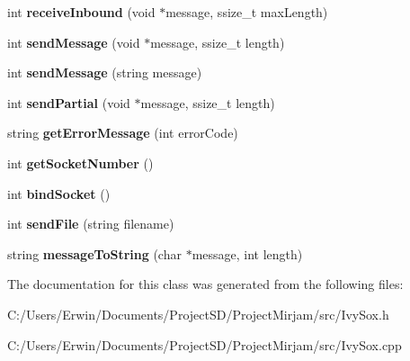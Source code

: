 \begin{DoxyCompactItemize}
\item 
\hypertarget{class_ivy_sox_a967f09bfa3ff35635d3f1e086193b140}{}int {\bfseries receive\+Inbound} (void $\ast$message, ssize\+\_\+t max\+Length)\label{class_ivy_sox_a967f09bfa3ff35635d3f1e086193b140}

\item 
\hypertarget{class_ivy_sox_a8cdc56a285fdd5b87873918c1c397e05}{}int {\bfseries send\+Message} (void $\ast$message, ssize\+\_\+t length)\label{class_ivy_sox_a8cdc56a285fdd5b87873918c1c397e05}

\item 
\hypertarget{class_ivy_sox_a49df5717e5cc8827d5725d832a0c4d17}{}int {\bfseries send\+Message} (string message)\label{class_ivy_sox_a49df5717e5cc8827d5725d832a0c4d17}

\item 
\hypertarget{class_ivy_sox_a3915fbfdfb0c5dd57da460f3de3fc21b}{}int {\bfseries send\+Partial} (void $\ast$message, ssize\+\_\+t length)\label{class_ivy_sox_a3915fbfdfb0c5dd57da460f3de3fc21b}

\item 
\hypertarget{class_ivy_sox_a58dac7efa4d8dbf6a08e98924ae9d584}{}string {\bfseries get\+Error\+Message} (int error\+Code)\label{class_ivy_sox_a58dac7efa4d8dbf6a08e98924ae9d584}

\item 
\hypertarget{class_ivy_sox_a09b0c17b4dda6c69e617e9271e9adb63}{}int {\bfseries get\+Socket\+Number} ()\label{class_ivy_sox_a09b0c17b4dda6c69e617e9271e9adb63}

\item 
\hypertarget{class_ivy_sox_afe73030aff140d6e1baa8324067d7f1a}{}int {\bfseries bind\+Socket} ()\label{class_ivy_sox_afe73030aff140d6e1baa8324067d7f1a}

\item 
\hypertarget{class_ivy_sox_a44b37c71adba4bd408fb8a0c36865b50}{}int {\bfseries send\+File} (string filename)\label{class_ivy_sox_a44b37c71adba4bd408fb8a0c36865b50}

\item 
\hypertarget{class_ivy_sox_ada62b805f634c9652bdd950084f32e33}{}string {\bfseries message\+To\+String} (char $\ast$message, int length)\label{class_ivy_sox_ada62b805f634c9652bdd950084f32e33}

\end{DoxyCompactItemize}


The documentation for this class was generated from the following files\+:\begin{DoxyCompactItemize}
\item 
C\+:/\+Users/\+Erwin/\+Documents/\+Project\+S\+D/\+Project\+Mirjam/src/Ivy\+Sox.\+h\item 
C\+:/\+Users/\+Erwin/\+Documents/\+Project\+S\+D/\+Project\+Mirjam/src/Ivy\+Sox.\+cpp\end{DoxyCompactItemize}

